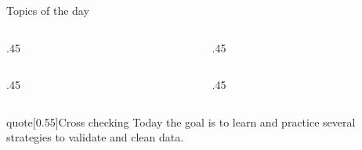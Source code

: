 
\PrepareURLsymbol[PB]
\begin{frame}
    \titlepage
\end{frame}
\begin{frame}[label=toc,plain,noframenumbering]{Topics of the day}
    \begin{columns}[t]
        \begin{column}{.45\textwidth}
            \hspace*{4mm}
            \begin{minipage}[t]{\textwidth}
                \begin{NoHyper}
                    \tableofcontents[sections={1}]
                \end{NoHyper}
            \end{minipage}
        \end{column}
        \begin{column}{.45\textwidth}
            \begin{minipage}[t][0.2\textheight]{\textwidth}
            \end{minipage}
        \end{column}
    \end{columns}
    \vspace{-10mm}
    \begin{columns}
        \begin{column}{.45\textwidth}
            \hspace*{4mm}
            \begin{minipage}[0.5\textheight]{\textwidth}
                \tableofcontents[sections={2-4}]
            \end{minipage}
        \end{column}
        \begin{column}{.45\textwidth}
            \begin{minipage}[0.5\textheight]{\textwidth}
                \tableofcontents[sections={5-}, hideallsubsections]
            \end{minipage}
        \end{column}
    \end{columns}
    \vspace{5mm}
    \begin{varblock}{quote}[0.55\textwidth]{Cross checking}
        \normalfont\small
        Today the goal is to learn and practice several strategies
        to validate and clean data.\\
    \end{varblock}
\end{frame}
